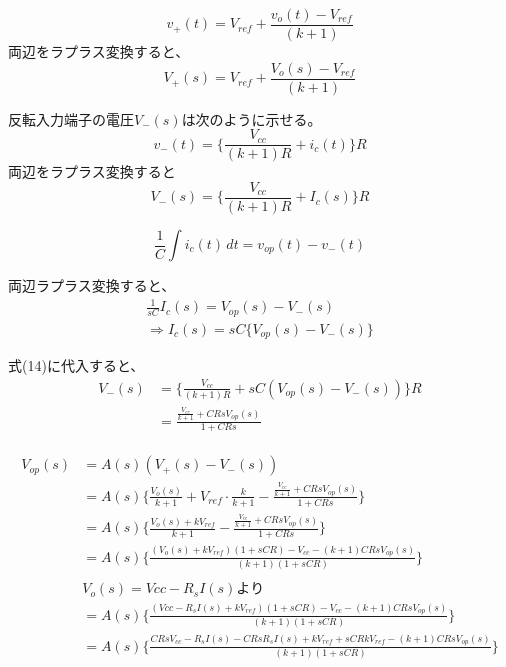 \documentclass{ltjsarticle}
\begin{document}
\begin{equation}
    v_{+}(t) = V_{ref} + \frac{v_{o}(t)-V_{ref}}{(k+1)}
\end{equation}
両辺をラプラス変換すると、
\begin{equation}
    V_{+}(s) = V_{ref} + \frac{V_{o}(s)-V_{ref}}{(k+1)}
\end{equation}

反転入力端子の電圧$V_{-}(s)$は次のように示せる。
\begin{equation}
        v_{-}(t) = \{\frac{V_{cc}}{(k+1)R} + i_{c}(t)\}R
\end{equation}
両辺をラプラス変換すると
\begin{equation}
        V_{-}(s) = \{\frac{V_{cc}}{(k+1)R} + I_{c}(s)\}R
\end{equation}


\begin{equation}
    \frac{1}{C} \int i_{c}(t) \, dt = v_{op}(t) - v_{-}(t)
\end{equation}

両辺ラプラス変換すると、
\begin{gather}
    \frac{1}{sC} I_{c}(s) = V_{op}(s) - V_{-}(s) \\
    \Rightarrow I_{c}(s) = sC\{V_{op}(s) - V_{-}(s)\}
\end{gather}

式(14)に代入すると、
\begin{equation}
    \begin{aligned}
        V_{-}(s) &= \{\frac{V_{cc}}{(k+1)R} + sC(V_{op}(s) - V_{-}(s))\}R \\
        &= \frac{\frac{V_{cc}}{k+1} + CRsV_{op}(s)}{1+CRs}
    \end{aligned}
\end{equation}


\begin{gather*}
    \begin{aligned}
        V_{op}(s) &= A(s)(V_{+}(s) - V_{-}(s)) \\
        &= A(s) \{\frac{V_{o}(s)}{k+1} + V_{ref} \cdot \frac{k}{k+1} -  \frac{\frac{V_{cc}}{k+1} + CRsV_{op}(s)}{1+CRs}\} \\
        &= A(s) \{\frac{V_{o}(s) + kV_{ref}}{k+1} -  \frac{\frac{V_{cc}}{k+1} + CRsV_{op}(s)}{1+CRs}\} \\
        &= A(s) \{\frac{(V_{o}(s) + kV_{ref})(1+sCR) - V_{cc} - (k+1)CRsV_{op}(s)}{(k+1)(1+sCR)}\} \\\\
        &V_{o}(s) = V{cc} - R_{s}I(s)より \\
        &= A(s) \{\frac{(V{cc} - R_{s}I(s) + kV_{ref})(1+sCR) - V_{cc} - (k+1)CRsV_{op}(s)}{(k+1)(1+sCR)}\} \\
        &= A(s) \{\frac{CRsV_{cc}-R_{s}I(s)-CRsR_{s}I(s)+kV_{ref}+sCRkV_{ref}-(k+1)CRsV_{op}(s)}{(k+1)(1+sCR)}\}
    \end{aligned}
\end{gather*}
\end{document}
